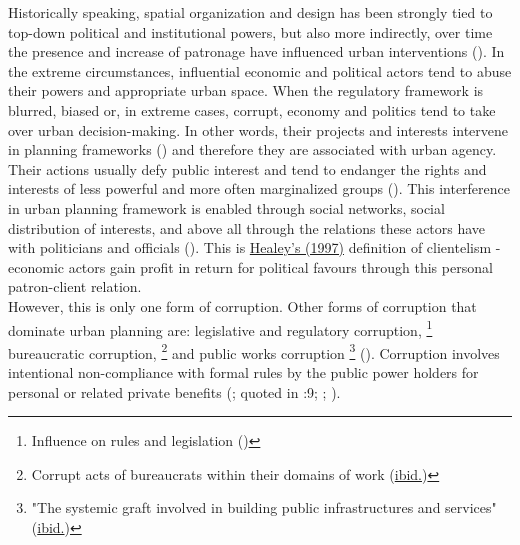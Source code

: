 \documentclass[11pt]{report}
\begin{document}
Historically speaking, spatial organization and design has been strongly tied to top-down political and institutional powers, but also more indirectly, over time the presence and increase of patronage have influenced urban interventions
(\href{Van}{\citealt{van_power_2013}}).
In the extreme circumstances, influential economic and political actors tend to abuse their powers and appropriate urban space.
When the regulatory framework is blurred, biased or, in extreme cases, corrupt, economy and politics tend to take over urban decision-making.
In other words, their projects and interests intervene in planning frameworks
(\href{Hudson}{\citealt{hudson_political_2014}}) and therefore they are associated with urban agency.
\\

Their actions usually defy public interest and tend to endanger the rights and interests of less powerful and more often marginalized groups (\href{Sager}{\citealt{sager_logic_2006}}).
This interference in urban planning framework is enabled through social networks, social distribution of interests, and above all through the relations these actors have with politicians and officials
(\href{Healey}{\citealt{healey_collaborative_1997}}).
This is \href{Healey}{Healey's (1997)} definition of clientelism - economic actors gain profit in return for political favours through this personal patron-client relation.
\\

However, this is only one form of corruption.
Other forms of corruption that dominate urban planning are:
legislative and regulatory corruption,
\footnote{Influence on rules and legislation (\href{Chiodelli}{\citealt{chiodelli_corruption_2015}})}
bureaucratic corruption,
\footnote{Corrupt acts of bureaucrats within their domains of work (\href{Chiodelli}{ibid.})}
and
public works corruption
\footnote{"The systemic graft involved in building public infrastructures and services" (\href{Chiodelli}{ibid.})}
(\href{Chiodelli}{\citealt{chiodelli_corruption_2015}}).
Corruption involves intentional  non-compliance  with  formal  rules by the public power holders for personal or related private benefits
(\href{Kaufmann}{\citealt{kaufmann_XXX_1997}};
\href{Tanzi}{\citealt{Tanzi_XXXXX}} quoted in 
\href{Begovic}{\citealt{begovic_xxx_2001}}:9; \href{Grubovic}{\citealt{grubovic_belgrade_2006}};
\href{Chiodelli}{\citealt{chiodelli_corruption_2015}}).
\\
\end{document}
